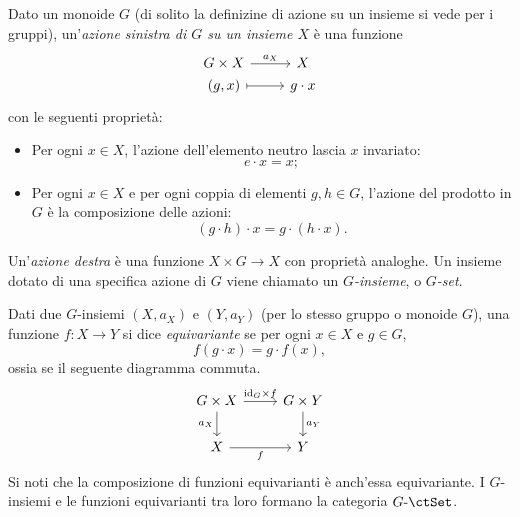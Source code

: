 \begin{example}\label{ex_cat_g_insiemi}
	Dato un monoide \(G\) (di solito la definizine di azione su un insieme si vede per i gruppi), un'\emph{azione sinistra di \(G\) su un insieme \(X\)} è una funzione
	\[
		\begin{tikzcd}[row sep=0]
			G\times X \ar{r}{a_X} & X \\
			(g,x) \ar[mapsto]{r} & g\cdot x
		\end{tikzcd}
	\]
	con le seguenti proprietà:
	\begin{itemize}
		\item Per ogni \(x\in X\), l'azione dell'elemento neutro lascia \(x\) invariato:
		      \[
			      e\cdot x = x ;
		      \]
		\item Per ogni \(x\in X\) e per ogni coppia di elementi \(g,h\in G\), l'azione del prodotto in \(G\) è la composizione delle azioni:
		      \[
			      (g\cdot h)\cdot x = g\cdot(h\cdot x) .
		      \]
	\end{itemize}
	Un'\emph{azione destra} è una funzione \(X\times G\to X\) con proprietà analoghe.
	Un insieme dotato di una specifica azione di \(G\) viene chiamato un \emph{\(G\)-insieme}, o \emph{\(G\)-set}.

	Dati due \(G\)-insiemi \((X,a_X)\) e \((Y,a_Y)\) (per lo stesso gruppo o monoide \(G\)), una funzione \(f:X\to Y\) si dice \emph{equivariante} se per ogni \(x\in X\) e \(g\in G\),
	\[
		f(g\cdot x) = g\cdot f(x) ,
	\]
	ossia se il seguente diagramma commuta.
	\[
		\begin{tikzcd}
			G\times X \ar{r}{\id_G\times f} \ar[d, "a_X"'] & G\times Y \ar{d}{a_Y} \\
			X \ar[r, "f"'] & Y
		\end{tikzcd}
	\]
	Si noti che la composizione di funzioni equivarianti è anch'essa equivariante. I \(G\)-insiemi e le funzioni equivarianti tra loro formano la categoria \(G\emdash\ctSet\).
\end{example}

